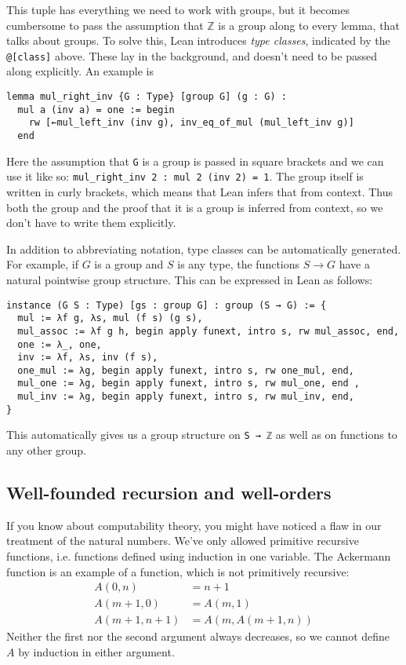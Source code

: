 \documentclass[a4paper, 12pt]{article}
\newcommand{\Z}{\mathbb{Z}}
\newcommand{\lean}[1]{\texttt{#1}}
\theoremstyle{changedot}
\theoremstyle{changedotbreak}
\theoremstyle{nonumberplain}
\begin{document}
This tuple has everything we need to work with groups, but it becomes cumbersome to pass the assumption that $\Z$ is a group along to every lemma, that talks about groups. To solve this, Lean introduces \textit{type classes}, indicated by the \lean{@[class]} above. These lay in the background, and doesn't need to be passed along explicitly. An example is
\begin{verbatim}
lemma mul_right_inv {G : Type} [group G] (g : G) :
  mul a (inv a) = one := begin
    rw [←mul_left_inv (inv g), inv_eq_of_mul (mul_left_inv g)]
  end
\end{verbatim}
Here the assumption that \lean{G} is a group is passed in square brackets and we can use it like so: \lean{mul_right_inv 2 : mul 2 (inv 2) = 1}. The group itself is written in curly brackets, which means that Lean infers that from context. Thus both the group and the proof that it is a group is inferred from context, so we don't have to write them explicitly.

In addition to abbreviating notation, type classes can be automatically generated. For example, if $G$ is a group and $S$ is any type, the functions $S \to G$ have a natural pointwise group structure. This can be expressed in Lean as follows:

\begin{verbatim}
instance (G S : Type) [gs : group G] : group (S → G) := {
  mul := λf g, λs, mul (f s) (g s),
  mul_assoc := λf g h, begin apply funext, intro s, rw mul_assoc, end,
  one := λ_, one,
  inv := λf, λs, inv (f s),
  one_mul := λg, begin apply funext, intro s, rw one_mul, end,
  mul_one := λg, begin apply funext, intro s, rw mul_one, end ,
  mul_inv := λg, begin apply funext, intro s, rw mul_inv, end,
}
\end{verbatim}

This automatically gives us a group structure on \lean{S → ℤ} as well as on functions to any other group. 

\subsection{Well-founded recursion and well-orders}
If you know about computability theory, you might have noticed a flaw in our treatment of the natural numbers. We've only allowed primitive recursive functions, i.e. functions defined using induction in one variable. The Ackermann function is an example of a function, which is not primitively recursive:
\begin{align*}
  A(0, n) &= n + 1 \\
  A(m + 1, 0) &= A(m, 1) \\
  A(m + 1, n + 1) &= A(m, A(m + 1, n))
\end{align*}
Neither the first nor the second argument always decreases, so we cannot define $A$ by induction in either argument.
\end{document}
